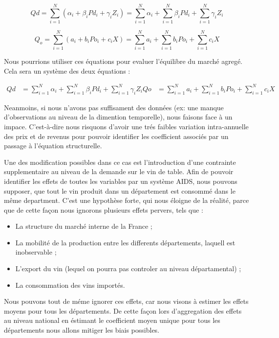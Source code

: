 \documentclass[11pt,]{article}
\providecommand{\tightlist}{%
  \setlength{\itemsep}{0pt}\setlength{\parskip}{0pt}}
\begin{document}
\begin{equation}
    Qd = \sum_{i = 1}^{N} ( \alpha_i + \beta_i Pd_i + \gamma_i Z_i ) = \sum_{i = 1}^{N} \alpha_i + \sum_{i = 1}^{N} \beta_i Pd_i + \sum_{i = 1}^{N} \gamma_i Z_i
\end{equation}

\begin{equation}
    Q_o = \sum_{i = 1}^{N} (a_i + b_i Po_i + c_i X) = \sum_{i = 1}^{N} a_i + \sum_{i = 1}^{N} b_i Po_i + \sum_{i = 1}^{N} c_i X
\end{equation}

Nous pourrions utiliser ces équations pour evaluer l'équilibre du marché
agregé. Cela sera un système des deux équations :

\begin{align*}
    Qd & = \sum_{i = 1}^{N} \alpha_i + \sum_{i = 1}^{N} \beta_i Pd_i + \sum_{i = 1}^{N} \gamma_i Z_i
    Qo & = \sum_{i = 1}^{N} a_i + \sum_{i = 1}^{N} b_i Po_i + \sum_{i = 1}^{N} c_i X
\end{align*}

Neanmoins, si nous n'avons pas suffisament des données (ex: une manque
d'observations au niveau de la dimention temporelle), nous faisons face
à un impace. C'est-à-dire nous risquons d'avoir une trés faibles
variation intra-annuelle des prix et de revenus pour pouvoir identifier
les coefficient associés par un passage à l'équation structurelle.

Une des modification possibles dans ce cas est l'introduction d'une
contrainte supplementaire au niveau de la demande sur le vin de table.
Afin de pouvoir identifier les effets de toutes les variables par un
système AIDS, nous pouvons supposer, que tout le vin produit dans un
département est consommé dans le même department. C'est une hypothèse
forte, qui nous éloigne de la réalité, parce que de cette façon nous
ignorons plusieurs effets pervers, tels que :

\begin{itemize}
\tightlist
\item
  La structure du marché interne de la France ;
\item
  La mobilité de la production entre les differents départements,
  laquell est inobservable ;
\item
  L'export du vin (lequel on pourra pas controler au niveau
  départamental) ;
\item
  La consommation des vins importés.
\end{itemize}

Nous pouvons tout de méme ignorer ces effets, car nous visons à estimer
les effets moyens pour tous les départements. De cette façon lors
d'aggregation des effets au niveau national en éstimant le coefficient
moyen unique pour tous les départements nous allons mitiger les biais
possibles.
\end{document}
